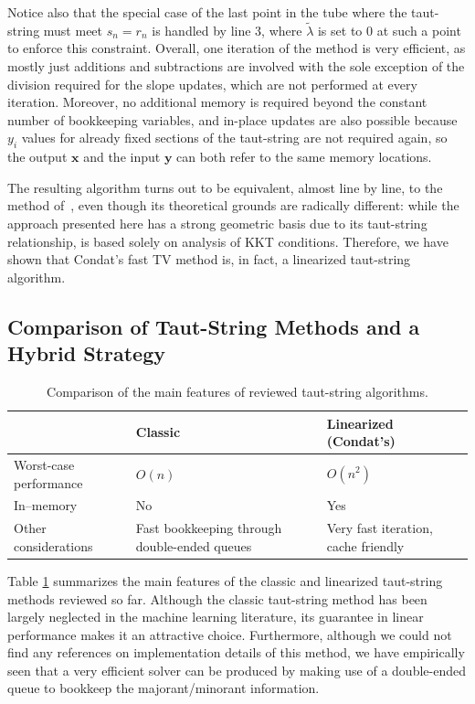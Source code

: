 \documentclass[twoside,11pt]{article}
\newcommand{\vx}{\bm{x}}       \newcommand{\vxh}{\hat{\bm{x}}}        \newcommand{\xh}{\hat{x}}    \newcommand{\vxt}{\tilde{\bm{x}}}       \newcommand{\xt}{\tilde{x}}
\newcommand{\vy}{\bm{y}}       \newcommand{\vyh}{\hat{\bm{y}}}        \newcommand{\yh}{\hat{y}}    \newcommand{\vyt}{\tilde{\bm{y}}}       \newcommand{\yt}{\tilde{y}}
\numberwithin{equation}{section}
\numberwithin{theorem}{section}
\begin{document}
Notice also that the special case of the last point in the tube where the taut-string must meet $s_n = r_n$ is handled by line 3, where $\tilde \lambda$ is set to $0$ at such a point to enforce this constraint. Overall, one iteration of the method is very efficient, as mostly just additions and subtractions are involved with the sole exception of the division required for the slope updates, which are not performed at every iteration. Moreover, no additional memory is required beyond the constant number of bookkeeping variables, and in-place updates are also possible because $y_i$ values for already fixed sections of the taut-string are not required again, so the output $\vx$ and the input $\vy$ can both refer to the same memory locations.

The resulting algorithm turns out to be equivalent, almost line by line, to the method of~\citet{fastTV}, even though its theoretical grounds are radically different: while the approach presented here has a strong geometric basis due to its taut-string relationship, \citep{fastTV} is based solely on analysis of KKT conditions. Therefore, we have shown that Condat's fast TV method is, in fact, a linearized taut-string algorithm.

\subsection{Comparison of Taut-String Methods and a Hybrid Strategy}
\label{sec:tauthybrid}

\begin{table}
  \begin{tabularx}{\textwidth}{l|X|X}
    & \bf Classic & \bf Linearized (Condat's) \\
  \hline
  Worst-case performance & $O(n)$ & $O(n^2)$ \\
  \hline
  In--memory & No & Yes \\
  \hline
  Other considerations & Fast bookkeeping through double-ended queues & Very fast iteration, cache friendly
  \end{tabularx}
  \caption{Comparison of the main features of reviewed taut-string algorithms.}
  \label{tab:tautstringComparison}
\end{table}

Table \ref{tab:tautstringComparison} summarizes the main features of the classic and linearized taut-string methods reviewed so far. Although the classic taut-string method has been largely neglected in the machine learning literature, its guarantee in linear performance makes it an attractive choice. Furthermore, although we could not find any references on implementation details of this method, we have empirically seen that a very efficient solver can be produced by making use of a double-ended queue to bookkeep the majorant/minorant information.
\end{document}
